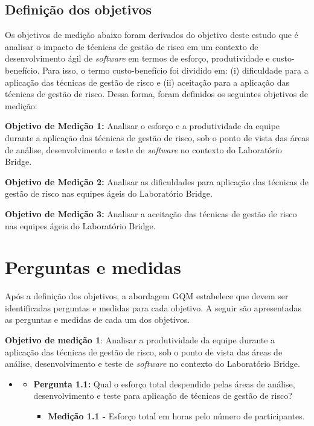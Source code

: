 \documentclass[
    12pt,       %
    openright,      %
    twoside,      %
    a4paper,      %
    english,      %
    french,       %
    spanish,      %
    brazil,       %
    ]{abntex2}
\begin{document}
\subsection{Definição dos objetivos}

Os objetivos de medição abaixo foram derivados do objetivo deste estudo que é analisar o impacto de técnicas de gestão de risco em um contexto de desenvolvimento ágil de \textit{software} em termos de esforço, produtividade e custo-benefício. Para isso, o termo custo-benefício foi dividido em: (i) dificuldade para a aplicação das técnicas de gestão de risco e (ii) aceitação para a aplicação das técnicas de gestão de risco. Dessa forma, foram definidos os seguintes objetivos de medição:

\textbf{Objetivo de Medição 1:} Analisar o esforço e a produtividade da equipe durante a aplicação das técnicas de gestão de risco, sob o ponto de vista das áreas de análise, desenvolvimento e teste de \textit{software} no contexto do Laboratório Bridge.

\textbf{Objetivo de Medição 2:} Analisar as dificuldades para aplicação das técnicas de gestão de risco nas equipes ágeis do Laboratório Bridge.

\textbf{Objetivo de Medição 3:} Analisar a aceitação das técnicas de gestão de risco nas equipes ágeis do Laboratório Bridge.

\section{Perguntas e medidas}

Após a definição dos objetivos, a abordagem GQM \cite{KOZIOLEK:2005} estabelece que devem ser identificadas perguntas e medidas para cada objetivo. A seguir são apresentadas as perguntas e medidas de cada um dos objetivos. 

\textbf{Objetivo de medição 1}: Analisar a produtividade da equipe durante a aplicação das técnicas de gestão de risco, sob o ponto de vista das áreas de análise, desenvolvimento e teste de \textit{software} no contexto do Laboratório Bridge.

\begin{itemize}[label={}]
\item
\begin{itemize}
        \item \textbf{Pergunta 1.1:} Qual o esforço total despendido pelas áreas de análise, desenvolvimento e teste para aplicação de técnicas de gestão de risco?
            \begin{itemize}[label={}]
                \item \textbf{Medição 1.1 - } Esforço total em horas pelo número de participantes.
            \end{itemize}
     
\end{itemize}
\end{itemize}
\end{document}
